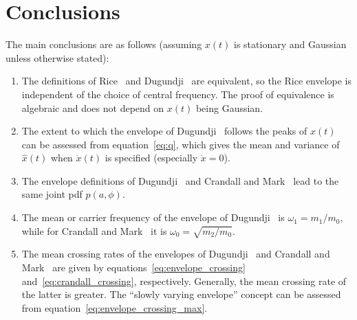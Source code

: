 \documentclass[12pt]{article}
\theoremstyle{plain}
\theoremstyle{definition}
\theoremstyle{remark}
\theoremstyle{plain}
\theoremstyle{definition}
\begin{document}
\section{Conclusions}
The main conclusions are as follows (assuming $x(t)$ is stationary and Gaussian unless otherwise stated):
\begin{enumerate}[label=(\arabic*)]
    \item The definitions of Rice~\cite{rice1954} and Dugundji~\cite{dugundji1958} are equivalent, so the Rice envelope is independent of the choice of central frequency. The proof of equivalence is algebraic and does not depend on $x(t)$ being Gaussian.
    \item The extent to which the envelope of Dugundji~\cite{dugundji1958} follows the peaks of $x(t)$ can be assessed from equation~\eqref{eq:q}, which gives the mean and variance of $\hat{x}(t)$ when $\dot{x}(t)$ is specified (especially $\dot{x} = 0$).
    \item The envelope definitions of Dugundji~\cite{dugundji1958} and Crandall and Mark~\cite{crandall1963} lead to the same joint pdf $p(a, \phi)$.
    \item The mean or carrier frequency of the envelope of Dugundji~\cite{dugundji1958} is $\omega_1 = m_1/m_0$, while for Crandall and Mark~\cite{crandall1963} it is $\omega_0 = \sqrt{m_2/m_0}$.
    \item The mean crossing rates of the envelopes of Dugundji~\cite{dugundji1958} and Crandall and Mark~\cite{crandall1963} are given by equations~\eqref{eq:envelope_crossing} and~\eqref{eq:crandall_crossing}, respectively. Generally, the mean crossing rate of the latter is greater. The ``slowly varying envelope'' concept can be assessed from equation~\eqref{eq:envelope_crossing_max}.
\end{enumerate}
\end{document}
